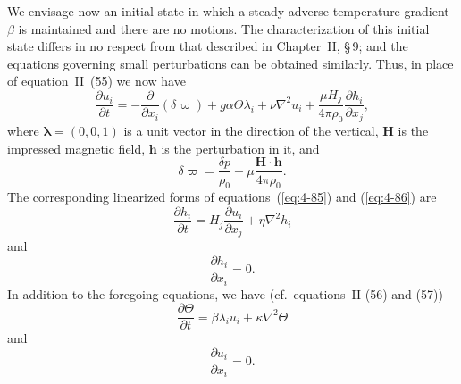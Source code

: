 We envisage now an initial state in which a steady adverse temperature gradient $\beta$ is maintained and there are no motions. The characterization of this initial state differs in no respect from that described in Chapter~II, \S\,9; and the equations governing small perturbations can be obtained similarly. Thus, in place of equation~II~(55) we now have
\begin{equation}
\label{eq:4-87}
\frac{\partial u_i}{\partial t} = -\frac{\partial}{\partial x_i}(\delta\varpi)+g\alpha\Theta\lambda_i+\nu\nabla^2 u_i+\frac{\mu H_j}{4\pi\rho_0}\frac{\partial h_i}{\partial x_j},
\end{equation}
where $\boldsymbol{\lambda}=(0,0,1)$ is a unit vector in the direction of the vertical, $\mathbf{H}$ is the impressed magnetic field, $\mathbf{h}$ is the perturbation in it, and
\begin{equation}
\label{eq:4-88}
\delta\varpi = \frac{\delta p}{\rho_0}+\mu\frac{\mathbf{H}\cdot\mathbf{h}}{4\pi\rho_0}.
\end{equation}
The corresponding linearized forms of equations~(\ref{eq:4-85}) and (\ref{eq:4-86}) are
\begin{equation}
\label{eq:4-89}
\frac{\partial h_i}{\partial t} = H_j\frac{\partial u_i}{\partial x_j}+\eta\nabla^2 h_i
\end{equation}
and
\begin{equation}
\label{eq:4-90}
\frac{\partial h_i}{\partial x_i} = 0.
\end{equation}
In addition to the foregoing equations, we have (cf.\ equations~II (56) and (57))
\begin{equation}
\label{eq:4-91}
\frac{\partial\Theta}{\partial t} = \beta\lambda_i u_i+\kappa\nabla^2\Theta
\end{equation}
and
\begin{equation}
\label{eq:4-92}
\frac{\partial u_i}{\partial x_i} = 0.
\end{equation}

